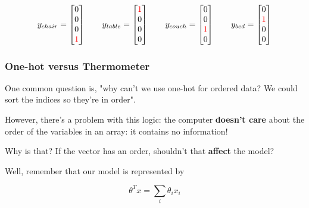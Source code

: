             \begin{equation}
                y_{chair} = 
                \begin{bmatrix}
                  0\\0\\0\\ \textcolor{red}{1}
                \end{bmatrix}
                \qquad
                y_{table} = 
                \begin{bmatrix}
                  \textcolor{red}{1}\\0\\0\\0
                \end{bmatrix}
                \qquad
                y_{couch} = 
                \begin{bmatrix}
                  0\\0\\\textcolor{red}{1}\\0
                \end{bmatrix}
                \qquad
                y_{bed} = 
                \begin{bmatrix}
                  0\\\textcolor{red}{1}\\0\\0
                \end{bmatrix}
            \end{equation}

            \subsecdiv
            \subsubsection{One-hot versus Thermometer}

                One common question is, "why can't we use one-hot for ordered data? We could sort the indices so they're in order".

                However, there's a problem with this logic: the computer \textbf{doesn't care} about the order of the variables in an array: it contains no information!

                Why is that? If the vector has an order, shouldn't that \textbf{affect} the model?
                
                Well, remember that our model is represented by 

                \begin{equation}
                    \theta^T x = \sum_i \theta_i x_i
                \end{equation}


